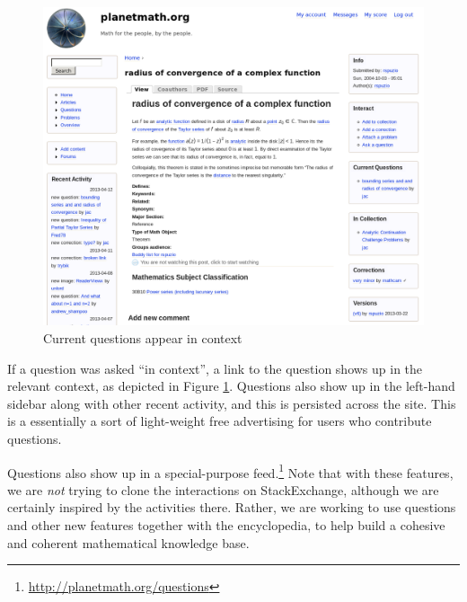 \begin{vplace}[0.7]
\begin{figure}[h]
\begin{center}
\includegraphics[width=.85\textwidth]{./inputs/QuestionsPartII.png}
\end{center}
\caption{Current questions appear in context \label{QuestionsPartII}}
\end{figure}
\bigskip

If a question was asked ``in context'', a link to the question shows
up in the relevant context, as depicted in Figure
\ref{QuestionsPartII}.  Questions also show up in the left-hand
sidebar along with other recent activity, and this is persisted across
the site.  This is a essentially a sort of light-weight free
advertising for users who contribute questions.

Questions also show up in a special-purpose
feed.\footnote{\url{http://planetmath.org/questions}} Note that with
these features, we are \emph{not} trying to clone the interactions on
StackExchange, although we are certainly inspired by the activities
there.  Rather, we are working to use questions and other new features
together with the encyclopedia, to help build a cohesive and coherent
mathematical knowledge base.
\end{vplace}

\newpage
\FloatBarrier

